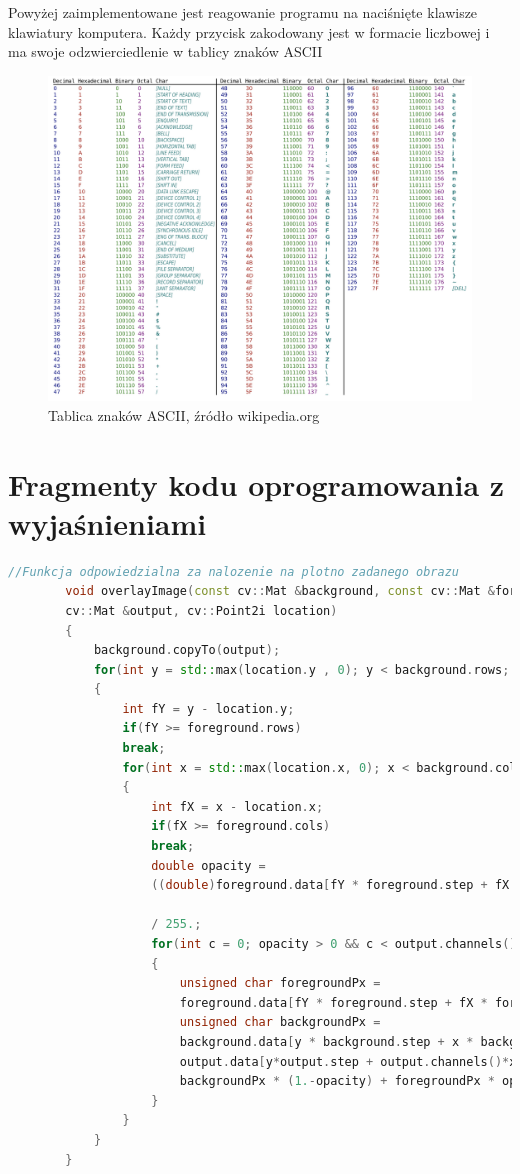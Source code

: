 \documentclass{article}
\begin{document}
	\newpage
	
	Powyżej zaimplementowane jest reagowanie programu na naciśnięte klawisze klawiatury komputera. Każdy przycisk zakodowany jest w formacie liczbowej i ma swoje odzwierciedlenie w tablicy znaków ASCII
	
	\begin{figure}
		\centering
		\includegraphics[width=15cm]{ascii}
		\caption{Tablica znaków ASCII, źródło wikipedia.org}
	\end{figure}
	
	\newpage
	
	\section*{\textbf{Fragmenty kodu oprogramowania z wyjaśnieniami} }
	
	\begin{lstlisting}[language=C++, caption=Nakładanie obrazu do kolorowania]
		//Funkcja odpowiedzialna za nalozenie na plotno zadanego obrazu
		void overlayImage(const cv::Mat &background, const cv::Mat &foreground, 
		cv::Mat &output, cv::Point2i location)
		{
			background.copyTo(output);
			for(int y = std::max(location.y , 0); y < background.rows; ++y)
			{
				int fY = y - location.y;
				if(fY >= foreground.rows)
				break;
				for(int x = std::max(location.x, 0); x < background.cols; ++x)
				{
					int fX = x - location.x;
					if(fX >= foreground.cols)
					break;
					double opacity =
					((double)foreground.data[fY * foreground.step + fX * foreground.channels() + 3])
					
					/ 255.;
					for(int c = 0; opacity > 0 && c < output.channels(); ++c)
					{
						unsigned char foregroundPx =
						foreground.data[fY * foreground.step + fX * foreground.channels() + c];
						unsigned char backgroundPx =
						background.data[y * background.step + x * background.channels() + c];
						output.data[y*output.step + output.channels()*x + c] =
						backgroundPx * (1.-opacity) + foregroundPx * opacity;
					}
				}
			}
		}
	\end{lstlisting}
	
\end{document}
